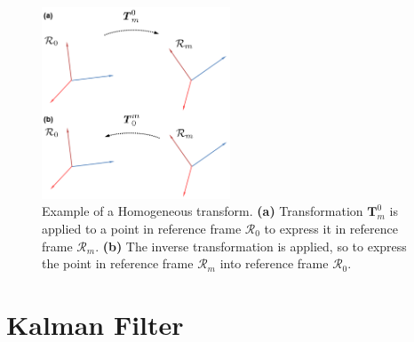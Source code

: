 \begin{figure}
    \centering
    \includegraphics[width=0.5\textwidth]{Images/fig15-homogeneous-transform.png}
    \caption[Example of a Homogeneous transform]{Example of a Homogeneous transform. \textbf{(a)} Transformation $\bm{T}_m^0$ is applied to a point in reference frame $\mathcal{R}_0$ to express it in reference frame $\mathcal{R}_m$. \textbf{(b)} The inverse transformation is applied, so to express the point in reference frame $\mathcal{R}_m$ into reference frame $\mathcal{R}_0$.  \cite{bona-dynamic-modelling}}
    \label{fig:chapter1:transform:homogeneous}
\end{figure}

\section{Kalman Filter}
\label{sec:chapter1:kf}

